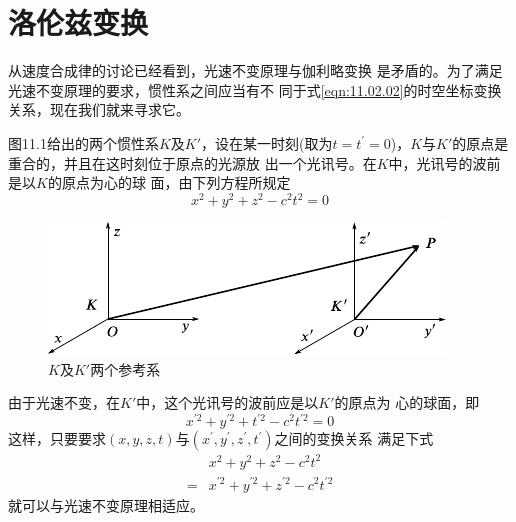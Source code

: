 \section{洛伦兹变换}\label{sec:11.04}

从速度合成律的讨论已经看到，光速不变原理与伽利略变换
是矛盾的。为了满足光速不变原理的要求，惯性系之间应当有不
同于式\eqref{eqn:11.02.02}的时空坐标变换关系，现在我们就来寻求它。

图11.1给出的两个惯性系$ K $及$ K' $，设在某一时刻(取为$  t = t ^ { \prime }
=0 $)，$ K $与$ K' $的原点是重合的，并且在这时刻位于原点的光源放
出一个光讯号。在$ K $中，光讯号的波前是以$ K $的原点为心的球
面，由下列方程所规定
\begin{equation*}
    x ^ { 2 } + y ^ { 2 } + z ^ { 2 } - c ^ { 2 } t ^ { 2 } = 0
\end{equation*}

\begin{figure}[h]
    \centering
    \includegraphics{figure/fig11.01}
    \caption{$ K $及$ K' $两个参考系}
    \label{fig:11.01}
\end{figure}
由于光速不变，在$ K' $中，这个光讯号的波前应是以$ K' $的原点为
心的球面，即
\begin{equation*}
    x ^ { \prime 2 } + y ^ { \prime 2 } + t ^ { \prime 2 } - c ^ { 2 } t ^ { \prime 2 } = 0
\end{equation*}
这样，只要要求$  \left( x , y , z , t \right)   $与$  \left( x ^ { \prime } , y  ^ { \prime } , z ^ { \prime } , t ^ { \prime } \right) $之间的变换关系
满足下式\vspace{-1.4em}
\begin{equation}\label{eqn:11.04.01}
    \begin{split}
        &x ^ { 2 } + y ^ { 2 } + z ^ { 2 } - c ^ { 2 } t ^ { 2 }  \\[-0.3em]
= &x ^ { \prime 2 } + y ^ { \prime 2 } + z ^ { \prime 2 } - c ^ { 2 } t ^ { \prime 2 }
    \end{split}
\end{equation}
就可以与光速不变原理相适应。

